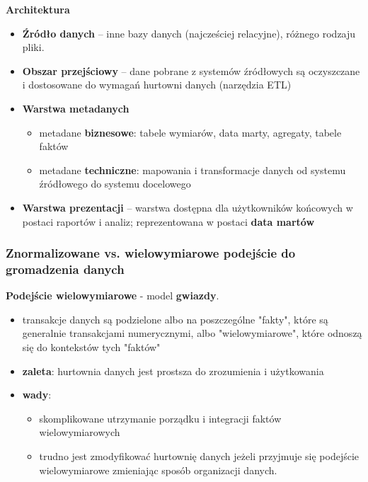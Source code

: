 \documentclass[a4paper]{article}
\begin{document}
    \textbf{Architektura}
    \begin{itemize}[noitemsep]
        \item \textbf{Źródło danych} – inne bazy danych (najcześciej relacyjne), różnego rodzaju pliki.
        \item \textbf{Obszar przejściowy} – dane pobrane z systemów źródłowych są oczyszczane i dostosowane do wymagań
        hurtowni danych (narzędzia ETL)
        \item \textbf{Warstwa metadanych}
        \begin{itemize}[noitemsep]
            \item metadane \textbf{biznesowe}: tabele wymiarów, data marty, agregaty, tabele faktów
            \item metadane \textbf{techniczne}: mapowania i transformacje danych od systemu źródłowego do systemu
            docelowego
        \end{itemize}
        \item \textbf{Warstwa prezentacji} – warstwa dostępna dla użytkowników końcowych w postaci raportów i analiz;
        reprezentowana w postaci \textbf{data martów}
    \end{itemize}

    \subsubsection{Znormalizowane vs. wielowymiarowe podejście do gromadzenia danych}
    \textbf{Podejście wielowymiarowe} - model \textbf{gwiazdy}.
    \begin{itemize}[noitemsep]
        \item transakcje danych są podzielone albo na poszczególne "fakty", które są generalnie transakcjami
        numerycznymi, albo "wielowymiarowe", które odnoszą się do kontekstów tych "faktów"
        \item \textbf{zaleta}: hurtownia danych jest prostsza do zrozumienia i użytkowania
        \item \textbf{wady}:
        \begin{itemize}[noitemsep]
            \item skomplikowane utrzymanie porządku i integracji faktów wielowymiarowych
            \item trudno jest zmodyfikować hurtownię danych jeżeli przyjmuje się podejście wielowymiarowe zmieniając
            sposób organizacji danych.
        \end{itemize}
    \end{itemize}
\end{document}
